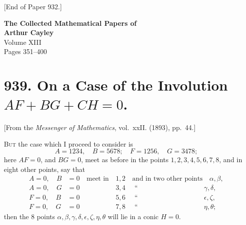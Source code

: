 \documentclass[11pt,a4paper]{book}
\begin{document}
\vspace{1cm}
\begin{center}
[End of Paper 932.]
\end{center}
\clearpage


\begin{center}
{\Large \textbf{The Collected Mathematical Papers of\\Arthur Cayley}}\\[6pt]
{\large Volume XIII}\\[12pt]
{\large Pages 351--400}\\[24pt]
\end{center}

\thispagestyle{empty}
\newpage
\setcounter{page}{351}

\section*{939. On a Case of the Involution $AF + BG + CH = 0$.}

[From the \textit{Messenger of Mathematics}, vol.~xxII. (1893), pp.~44.]

\textsc{But} the case which I proceed to consider is
\[
A = 1234, \quad B = 5678; \quad F = 1256, \quad G = 3478;
\]
here $AF = 0$, and $BG = 0$, meet as before in the points $1, 2, 3, 4, 5, 6, 7, 8$, and in
eight other points, say that
\begin{align*}
A = 0, \quad B &= 0 \quad \text{meet in} \quad 1, 2 \quad \text{and in two other points} \quad \alpha, \beta, \\
A = 0, \quad G &= 0 \quad\phantom{\text{meet in}} \quad 3, 4 \quad\,\, \text{``}\,\,\, \quad\phantom{\text{two other points}} \quad \gamma, \delta, \\
F = 0, \quad B &= 0 \quad\phantom{\text{meet in}} \quad 5, 6 \quad\,\, \text{``}\,\,\, \quad\phantom{\text{two other points}} \quad \epsilon, \zeta, \\
F = 0, \quad G &= 0 \quad\phantom{\text{meet in}} \quad 7, 8 \quad\,\, \text{``}\,\,\, \quad\phantom{\text{two other points}} \quad \eta, \theta;
\end{align*}
then the 8 points $\alpha, \beta, \gamma, \delta, \epsilon, \zeta, \eta, \theta$ will lie in a conic $H = 0$.
\end{document}
